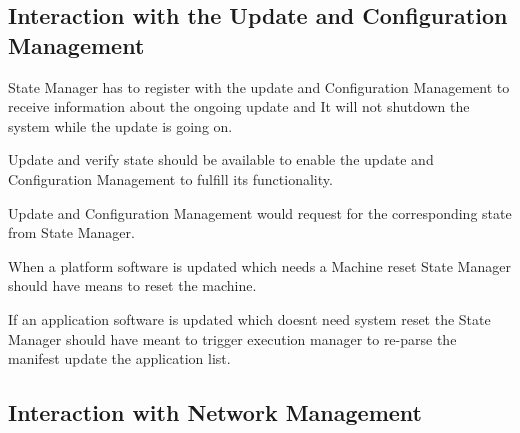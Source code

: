 \subsection*{Interaction with the Update and Configuration Management}


\begin{DoxyItemize}
\item State Manager has to register with the update and Configuration Management to receive information about the ongoing update and It will not shutdown the system while the update is going on.
\item Update and verify state should be available to enable the update and Configuration Management to fulfill its functionality.
\item Update and Configuration Management would request for the corresponding state from State Manager.
\item When a platform software is updated which needs a Machine reset State Manager should have means to reset the machine.
\item If an application software is updated which doesn\textquotesingle{}t need system reset the State Manager should have meant to trigger execution manager to re-\/parse the manifest update the application list.
\end{DoxyItemize}

\subsection*{Interaction with Network Management}


